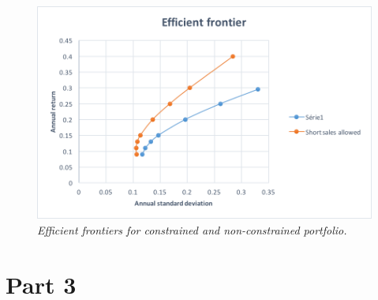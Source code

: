 \documentclass[a4paper,11pt,twoside]{article}
\begin{document}
\begin{figure}[H] %
\begin{center}
\includegraphics[width=12cm]{pic/graph_2.png} 
\end{center}
\caption{\em  \label{graph2}
Efficient frontiers for constrained and non-constrained portfolio.
}
\end{figure}



\section{Part 3}
\end{document}
